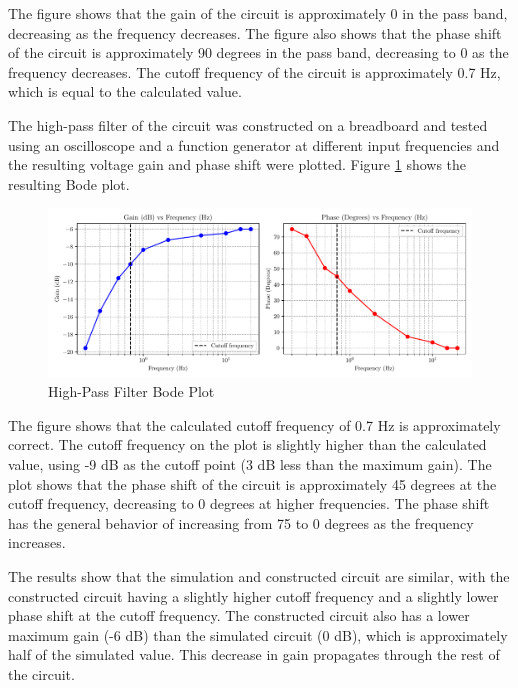 \documentclass[CMPE]{KGCOEReport}
\begin{document}
The figure shows that the gain of the circuit is approximately 0 in the pass band, decreasing as the frequency decreases. The figure also shows that the phase shift of the circuit is approximately 90 degrees in the pass band, decreasing to 0 as the frequency decreases. The cutoff frequency of the circuit is approximately 0.7 Hz, which is equal to the calculated value.

The high-pass filter of the circuit was constructed on a breadboard and tested using an oscilloscope and a function generator at different input frequencies and the resulting voltage gain and phase shift were plotted. Figure \ref{fig:highPassBode} shows the resulting Bode plot.

\begin{figure}[H]
    \centering
    \includegraphics[width=1\textwidth]{high_pass_plot.pdf}
    \caption{High-Pass Filter Bode Plot}
    \label{fig:highPassBode}
\end{figure}

The figure shows that the calculated cutoff frequency of 0.7 Hz is approximately correct. The cutoff frequency on the plot is slightly higher than the calculated value, using -9 dB as the cutoff point (3 dB less than the maximum gain). The plot shows that the phase shift of the circuit is approximately 45 degrees at the cutoff frequency, decreasing to 0 degrees at higher frequencies. The phase shift has the general behavior of increasing from 75 to 0 degrees as the frequency increases.

The results show that the simulation and constructed circuit are similar, with the constructed circuit having a slightly higher cutoff frequency and a slightly lower phase shift at the cutoff frequency. The constructed circuit also has a lower maximum gain (-6 dB) than the simulated circuit (0 dB), which is approximately half of the simulated value. This decrease in gain propagates through the rest of the circuit.

\bigskip
\end{document}
